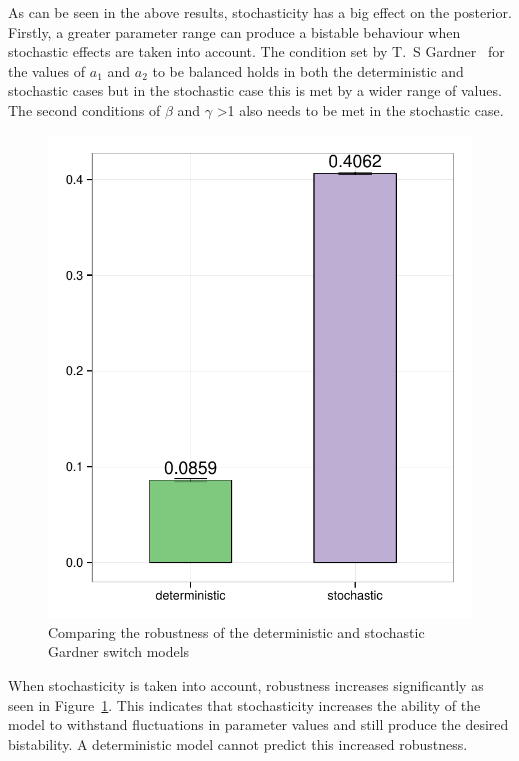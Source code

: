 As can be seen in the above results, stochasticity has a big effect on the posterior. Firstly, a greater parameter range can produce a bistable behaviour when stochastic effects are taken into account. The condition set by T.~S Gardner~\autocite{Gardner:2000vha} for the values of $a_1$ and $a_2$ to be balanced holds in both the deterministic and stochastic cases but in the stochastic case this is met by a wider range of values. The second conditions of $\beta$  and $\gamma$ \textgreater 1 also needs to be met in the stochastic case. 

\clearpage
\begin{figure}[p]
\centering
\includegraphics[scale=0.8]{chapterModelling/images/Gardner/wide_var/robustness_comparison.pdf}
\caption{Comparing the robustness of the deterministic and stochastic Gardner switch models}
\label{fig:Gard_robst}
\end{figure}

 When stochasticity is taken into account, robustness increases significantly as seen in Figure~\ref{fig:Gard_robst}. This indicates that stochasticity increases the ability of the model to withstand fluctuations in parameter values and still produce the desired bistability. A deterministic model cannot predict this increased robustness.


